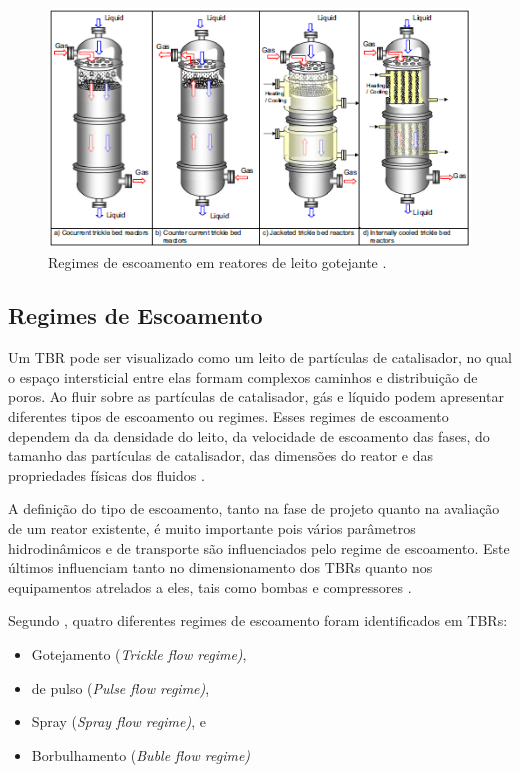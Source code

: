  \begin{figure}[htb]
 \centering \includegraphics[scale=0.75]{images/Chap2/configuracoestbr.png}
 \caption{Regimes de escoamento em reatores de leito gotejante \cite{Gunjal2005}.}
 \label{fig:configuracoestbr}
 \end{figure}


\subsection {Regimes de Escoamento}
\label{sec:escoamento}

Um TBR pode ser visualizado como um leito de partículas de catalisador, no qual
o espaço intersticial entre elas formam complexos caminhos e distribuição de
poros. Ao fluir sobre as partículas de catalisador, gás e líquido podem
apresentar diferentes tipos de escoamento ou regimes. Esses regimes de
escoamento dependem da da densidade do leito, da velocidade de escoamento das
fases, do tamanho das partículas de catalisador, das dimensões do reator e das
propriedades físicas dos fluidos \cite{Ranade2011}.

A definição do tipo de escoamento, tanto na fase de projeto quanto na avaliação
de um reator existente, é muito importante pois vários parâmetros
hidrodinâmicos e de transporte são influenciados pelo regime de escoamento. Este
últimos influenciam tanto no dimensionamento dos TBRs quanto nos
equipamentos atrelados a eles, tais como bombas e compressores
\cite{Ranade2011}.

Segundo , quatro
diferentes regimes de escoamento foram identificados em TBRs:

\begin{itemize}
\item Gotejamento (\emph{Trickle flow regime)},
\item de pulso (\emph{Pulse flow regime)},
\item Spray (\emph{Spray flow regime)}, e
\item Borbulhamento (\emph{Buble flow regime)}
\end{itemize}

